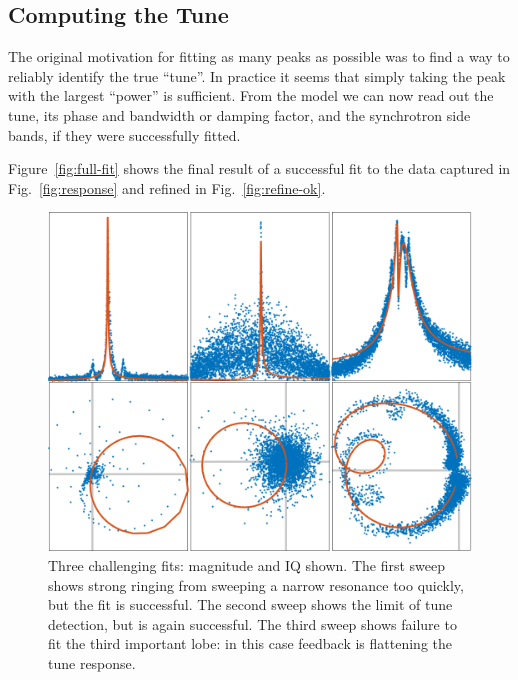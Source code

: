 \documentclass[
    a4paper,
    keeplastbox,            %
    hyphens,                %
    nospread,               %
    refpage,                %
]{jacow}
\newcommand{\squarecaption}[2][1]{\caption[#1]{#2\unskip\parfillskip 0pt}}
\begin{document}
\subsection{Computing the Tune}

The original motivation for fitting as many peaks as possible was to find a way
to reliably identify the true ``tune''.  In practice it seems that simply taking
the peak with the largest ``power'' is sufficient.  From the model we can now
read out the tune, its phase and bandwidth or damping factor, and the
synchrotron side bands, if they were successfully fitted.

Figure~\ref{fig:full-fit} shows the final result of a successful fit to the data
captured in Fig.~\ref{fig:response} and refined in Fig.~\ref{fig:refine-ok}.


\begin{figure}[ht]
\includegraphics[width=\linewidth]{WECO03f6.png}
\squarecaption{%
Three challenging fits: magnitude and IQ shown.  The first sweep shows
strong ringing from sweeping a narrow resonance too quickly, but the fit is
successful.  The second sweep shows the limit of tune detection, but is again
successful.  The third sweep shows failure to fit the third important lobe: in
this case feedback is flattening the tune response.
}
\label{fig:challenge-zoo}
\end{figure}
\end{document}
